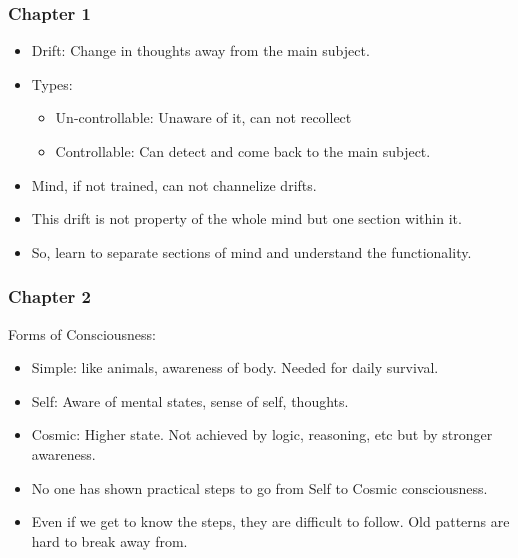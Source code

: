 \begin{frame}[fragile]
\frametitle{Chapter 1}

\begin{itemize}
\item Drift: Change in thoughts away from the main subject.
\item Types:
\begin{itemize}
\item Un-controllable: Unaware of it, can not recollect
\item Controllable: Can detect and come back to the main subject.
\end{itemize}
\item Mind, if not trained, can not channelize drifts.
\item This drift is not property of the whole mind but one section within it.
\item So, learn to separate sections of mind and understand the functionality.
\end{itemize}


\end{frame}

\begin{frame}[fragile]
\frametitle{Chapter 2}
Forms of Consciousness:
\begin{itemize}
\item Simple: like animals, awareness of body. Needed for daily survival.
\item Self: Aware of mental states, sense of self, thoughts.
\item Cosmic: Higher state. Not achieved by logic, reasoning, etc but by stronger awareness.
\item No one has shown practical steps to go from Self to Cosmic consciousness.
\item Even if we get to know the steps, they are difficult to follow. Old patterns are hard to break away from.
\end{itemize}


\end{frame}

